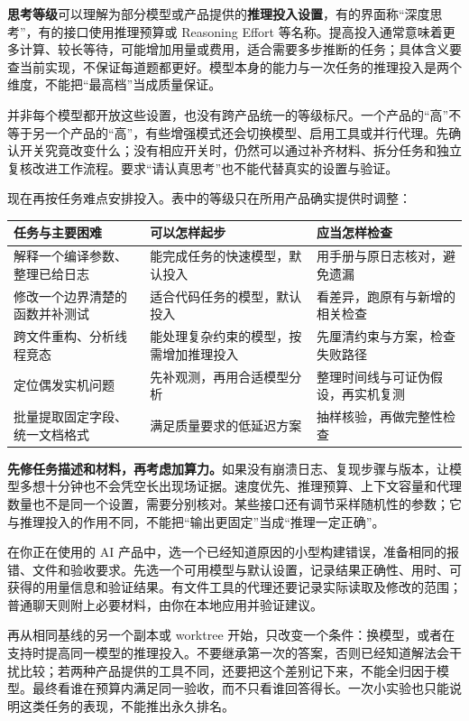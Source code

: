 \textbf{思考等级}可以理解为部分模型或产品提供的\textbf{推理投入设置}，有的界面称“深度思考”，有的接口使用推理预算或 Reasoning Effort 等名称。提高投入通常意味着更多计算、较长等待，可能增加用量或费用，适合需要多步推断的任务；具体含义要查当前实现，不保证每道题都更好。模型本身的能力与一次任务的推理投入是两个维度，不能把“最高档”当成质量保证。

并非每个模型都开放这些设置，也没有跨产品统一的等级标尺。一个产品的“高”不等于另一个产品的“高”，有些增强模式还会切换模型、启用工具或并行代理。先确认开关究竟改变什么；没有相应开关时，仍然可以通过补齐材料、拆分任务和独立复核改进工作流程。要求“请认真思考”也不能代替真实的设置与验证。

现在再按任务难点安排投入。表中的等级只在所用产品确实提供时调整：
\begin{center}
\begin{tabular}{p{}p{}p{}}
\toprule
任务与主要困难 & 可以怎样起步 & 应当怎样检查 \\
\midrule
解释一个编译参数、整理已给日志 & 能完成任务的快速模型，默认投入 & 用手册与原日志核对，避免遗漏 \\
修改一个边界清楚的函数并补测试 & 适合代码任务的模型，默认投入 & 看差异，跑原有与新增的相关检查 \\
跨文件重构、分析线程竞态 & 能处理复杂约束的模型，按需增加推理投入 & 先厘清约束与方案，检查失败路径 \\
定位偶发实机问题 & 先补观测，再用合适模型分析 & 整理时间线与可证伪假设，再实机复测 \\
批量提取固定字段、统一文档格式 & 满足质量要求的低延迟方案 & 抽样核验，再做完整性检查 \\
\bottomrule
\end{tabular}
\end{center}
\textbf{先修任务描述和材料，再考虑加算力。}如果没有崩溃日志、复现步骤与版本，让模型多想十分钟也不会凭空长出现场证据。速度优先、推理预算、上下文容量和代理数量也不是同一个设置，需要分别核对。某些接口还有调节采样随机性的参数；它与推理投入的作用不同，不能把“输出更固定”当成“推理一定正确”。

\begin{example}[用一个熟悉的小任务比较设置]
在你正在使用的 AI 产品中，选一个已经知道原因的小型构建错误，准备相同的报错、文件和验收要求。先选一个可用模型与默认设置，记录结果正确性、用时、可获得的用量信息和验证结果。有文件工具的代理还要记录实际读取及修改的范围；普通聊天则附上必要材料，由你在本地应用并验证建议。

再从相同基线的另一个副本或 worktree 开始，只改变一个条件：换模型，或者在支持时提高同一模型的推理投入。不要继承第一次的答案，否则已经知道解法会干扰比较；若两种产品提供的工具不同，还要把这个差别记下来，不能全归因于模型。最终看谁在预算内满足同一验收，而不只看谁回答得长。一次小实验也只能说明这类任务的表现，不能推出永久排名。
\end{example}


